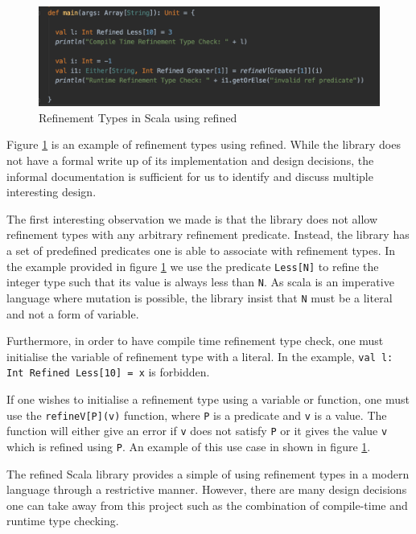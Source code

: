 \documentclass[a4paper,12pt]{report}
\begin{document}
\begin{figure}[H]
  \begin{center}
    \includegraphics[scale=0.7]{assets/refined_scala.PNG}
  \end{center}
  \caption{Refinement Types in Scala using refined}
  \label{code:refined-scala}
\end{figure}

Figure \ref{code:refined-scala} is an example of refinement types using  
refined. While the library does not have a formal write up of its 
implementation and design decisions, the informal documentation is sufficient 
for us to identify and discuss multiple interesting design. 

\par
The first interesting observation we made is that the library does not allow 
refinement types with any arbitrary refinement predicate. Instead,  
the library has a set of predefined predicates one is able to associate 
with refinement types. In the example provided in figure \ref{code:refined-scala} 
we use the predicate \verb|Less[N]| to refine the integer type such that its value 
is always less than \verb|N|. As scala is an imperative language where mutation 
is possible, the library insist that \verb|N| must be a 
literal and not a form of variable.

\par
Furthermore, in order to have compile time refinement type check, one must 
initialise the variable of refinement type with a literal. In the example, 
\verb|val l: Int Refined Less[10] = x| is forbidden. 

\par
If one wishes to initialise a refinement type using a variable or function, one 
must use the \verb|refineV[P](v)| function, where \verb|P| is a predicate and 
\verb|v| is a value. The function will either give an error if \verb|v| does not 
satisfy \verb|P| or it gives the value \verb|v| which is refined using \verb|P|. 
An example of this use case in shown in figure \ref{code:refined-scala}.

\par
The refined Scala library provides a simple of using refinement types in a modern 
language through a restrictive manner. However, there are many design decisions 
one can take away from this project such as the combination of compile-time and 
runtime type checking. 
\end{document}
